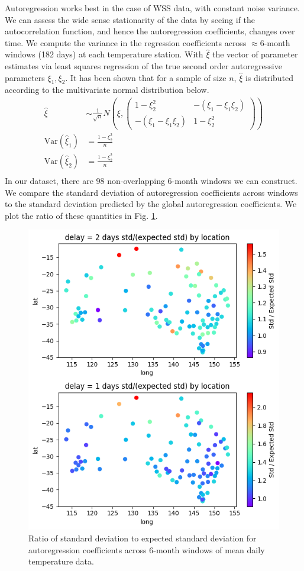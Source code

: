 \documentclass[12pt,a4paper]{article} %
\begin{document}
Autoregression works best in the case of WSS data, with constant noise variance. We can assess the wide sense stationarity of the data by seeing if the autocorrelation function, and hence the autoregression coefficients, changes over time. We compute the variance in the regression coefficients across $\approx6$-month windows (182 days) at each temperature station. With $\hat\xi$ the vector of parameter estimates via least squares regression of the true second order autoregressive parameters $\xi_1, \xi_2$. It has been shown \cite{hamilton} that for a sample of size $n$, $\hat\xi$ is distributed according to the multivariate normal distribution below.
\begin{align*}
    \hat\xi&\sim \frac{1}{\sqrt n}N(\xi, \begin{pmatrix}
        1-\xi_2^2 & -(\xi_1-\xi_1\xi_2) \\
        -(\xi_1-\xi_1\xi_2) & 1-\xi_2^2
    \end{pmatrix})\\
    \text{Var}(\hat\xi_1)&=\frac{1-\xi_2^2}{n}\\
    \text{Var}(\hat\xi_2)&=\frac{1-\xi_2^2}{n}\\
\end{align*}
In our dataset, there are 98 non-overlapping 6-month windows we can construct. We compare the standard deviation of autoregression coefficients across windows to the standard deviation predicted by the global autoregression coefficients. We plot the ratio of these quantities in Fig. \ref{fig:std_ratio}.

\begin{figure}[!ht]
    \centering
    \includegraphics[width=.7\linewidth]{mean_regression_std_ratio_by_loc.png}
    \caption{Ratio of standard deviation to expected standard deviation for autoregression coefficients across 6-month windows of mean daily temperature data.}
    \label{fig:std_ratio}
\end{figure}
\end{document}
